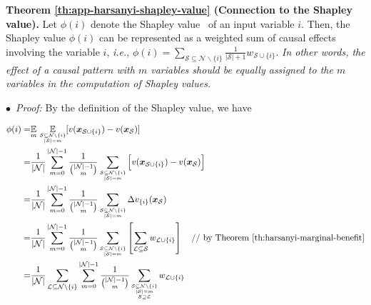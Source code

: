 \vspace{5pt}
\noindent\textbf{Theorem \ref{th:app-harsanyi-shapley-value} (Connection to the Shapley value).} Let {\small $\phi(i)$} denote the Shapley value~\cite{shapley1953value} of an input variable $i$.
Then, the Shapley value {\small$\phi(i)$} can be represented as a weighted sum of causal effects involving the variable {\small$i$}, \emph{i.e.}, {\small $\phi(i)=\sum_{\mathcal{S}\subseteq \mathcal{N}\backslash\{i\}}\frac{1}{|\mathcal{S}|+1} w_{\mathcal{S}\cup\{i\}}$}.
\textit{In other words, the effect of a causal pattern with {\small$m$} variables should be equally assigned to the {\small$m$} variables in the computation of Shapley values.}

$\bullet$~\textit{Proof:} By the definition of the Shapley value, we have


\begin{small}
\begin{align*}
\phi(i)=& \underset{\scriptsize m}{\mathbb{E}}\ \underset{\scriptsize\substack{\mathcal{S}\subseteq \mathcal{N}\backslash\{i\}\\ |\mathcal{S}|=m}}{\mathbb{E}}[v(\boldsymbol{x}_{\mathcal{S}\cup\{i\}})-v(\boldsymbol{x}_{\mathcal{S}})]\\
=& \frac{1}{|\mathcal{N}|}\sum_{m=0}^{|\mathcal{N}|-1}\frac{1}{\binom{|\mathcal{N}|-1}{m}}\sum_{\scriptsize \substack{\mathcal{S}\subseteq \mathcal{N}\backslash\{i\}\\ |\mathcal{S}|=m}}\Big[v(\boldsymbol{x}_{\mathcal{S}\cup\{i\}})-v(\boldsymbol{x}_{\mathcal{S}})\Big] \\
=& \frac{1}{|\mathcal{N}|}\sum_{m=0}^{|\mathcal{N}|-1}\frac{1}{\binom{|\mathcal{N}|-1}{m}}\sum_{\scriptsize \substack{\mathcal{S}\subseteq \mathcal{N}\backslash\{i\}\\ |\mathcal{S}|=m}}\Delta v_{\{i\}}(\boldsymbol{x}_{\mathcal{S}}) \\
=& \frac{1}{|\mathcal{N}|}\sum_{m=0}^{|\mathcal{N}|-1}\frac{1}{\binom{|\mathcal{N}|-1}{m}}\sum_{\scriptsize \substack{\mathcal{S}\subseteq \mathcal{N}\backslash\{i\}\\ |\mathcal{S}|=m}} \left[\sum_{\mathcal{L}\subseteq \mathcal{S}}w_{\mathcal{L}\cup\{i\}}\right]\quad\text{// by Theorem \ref{th:harsanyi-marginal-benefit}}\\
=& \frac{1}{|\mathcal{N}|}\sum_{\mathcal{L}\subseteq \mathcal{N}\backslash\{i\}} \sum_{m=0}^{|\mathcal{N}|-1} \frac{1}{\binom{|\mathcal{N}|-1}{m}}\sum_{\scriptsize\substack{\mathcal{S}\subseteq \mathcal{N}\backslash\{i\}\\|\mathcal{S}|=m\\ \mathcal{S}\supseteq \mathcal{L}}} w_{\mathcal{L}\cup\{i\}}\\

\end{align*}
\end{small}
